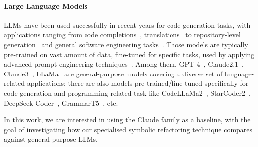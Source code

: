 \documentclass[sigconf,review,anonymous]{acmart}
\begin{document}
\paragraph{Large Language Models}
LLMs have been used successfully in recent years for code generation tasks, with applications ranging from code completions~\cite{llmsforcodecompletion,ni2023lever,codegenclasslevel,Ding2024cocomic}, translations~\cite{tang-etal-2023-explain,lostintranslation} to repository-level generation~\cite{zhang2023repocoder} and general software engineering tasks~\cite{yang2024sweagent}.
Those models are typically pre-trained on vast amount of data, fine-tuned for specific tasks, used by applying advanced prompt engineering techniques~\cite{jiang2024survey}.
Among them, GPT-4~\cite{openai2024gpt4}, Claude2.1~\cite{claude}, Claude3~\cite{claude}, 
LLaMa~\cite{touvron2023llama} are general-purpose models covering a diverse set of language-related applications; there are also models pre-trained/fine-tuned specifically for code generation and programming-related task like CodeLLaMa2~\cite{roziere2024code}, 
StarCoder2~\cite{lozhkov2024starcoder}, DeepSeek-Coder~\cite{guo2024deepseekcoder}, GrammarT5~\cite{grammart5}, etc.

In this work, we are interested in using the Claude family as a baseline, with the goal of investigating how our specialised symbolic refactoring technique compares
against general-purpose LLMs.


\end{document}
